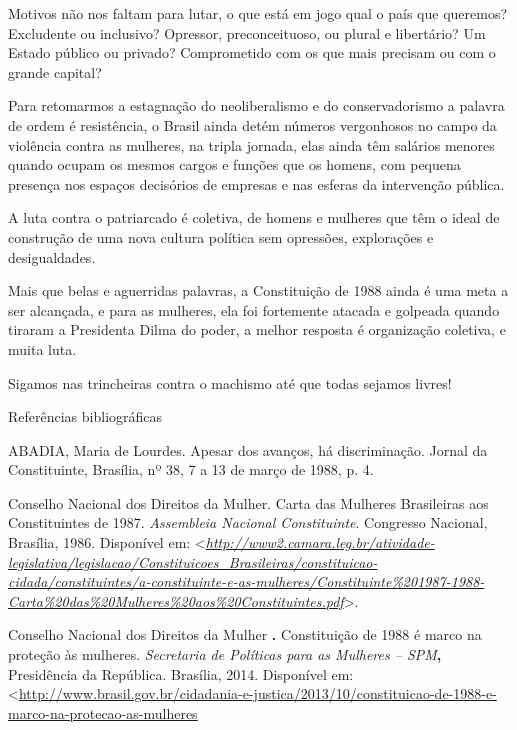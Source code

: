 Motivos não nos faltam para lutar, o que está em jogo qual o país que
queremos? Excludente ou inclusivo? Opressor, preconceituoso, ou plural e
libertário? Um Estado público ou privado? Comprometido com os que mais
precisam ou com o grande capital?

Para retomarmos a estagnação do neoliberalismo e do conservadorismo a
palavra de ordem é resistência, o Brasil ainda detém números vergonhosos
no campo da violência contra as mulheres, na tripla jornada, elas ainda
têm salários menores quando ocupam os mesmos cargos e funções que os
homens, com pequena presença nos espaços decisórios de empresas e nas
esferas da intervenção pública.

A luta contra o patriarcado é coletiva, de homens e mulheres que têm o
ideal de construção de uma nova cultura política sem opressões,
explorações e desigualdades.

Mais que belas e aguerridas palavras, a Constituição de 1988 ainda é uma
meta a ser alcançada, e para as mulheres, ela foi fortemente atacada e
golpeada quando tiraram a Presidenta Dilma do poder, a melhor resposta é
organização coletiva, e muita luta.

Sigamos nas trincheiras contra o machismo até que todas sejamos livres!

Referências bibliográficas

ABADIA, Maria de Lourdes. Apesar dos avanços, há discriminação. Jornal
da Constituinte, Brasília, nº 38, 7 a 13 de março de 1988, p. 4.

Conselho Nacional dos Direitos da Mulher. Carta das Mulheres Brasileiras
aos Constituintes de 1987. \emph{Assembleia Nacional Constituinte}.
Congresso Nacional, Brasília, 1986. Disponível em:
\textless{}\href{http://www2.camara.leg.br/atividade-legislativa/legislacao/Constituicoes_Brasileiras/constituicao-cidada/constituintes/a-constituinte-e-as-mulheres/Constituinte\%201987-1988-Carta\%20das\%20Mulheres\%20aos\%20Constituintes.pdf}{\emph{http://www2.camara.leg.br/atividade-legislativa/legislacao/Constituicoes\_Brasileiras/constituicao-cidada/constituintes/a-constituinte-e-as-mulheres/Constituinte\%201987-1988-Carta\%20das\%20Mulheres\%20aos\%20Constituintes.pdf}}\textgreater{}.

Conselho Nacional dos Direitos da Mulher \textbf{.} Constituição de 1988
é marco na proteção às mulheres. \emph{Secretaria de Políticas para as
Mulheres -- SPM}\textbf{,} Presidência da República. Brasília, 2014.
Disponível em:
\textless{}\url{http://www.brasil.gov.br/cidadania-e-justica/2013/10/constituicao-de-1988-e-marco-na-protecao-as-mulheres}

